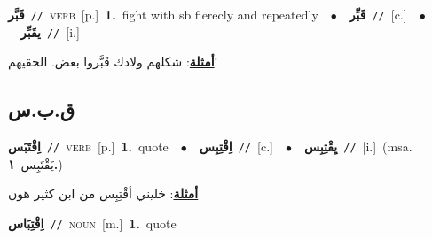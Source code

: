 \documentclass[10pt,a4paper,twoside]{article} %
\begin{document}
\begin{multicols}{2}
{\setlength\topsep{0pt}\textbf{\foreignlanguage{arabic}{قَبَّر}}\ {\color{gray}\texttt{//}\color{black}}\ \textsc{verb}\ [p.]\ \textbf{1.}~fight with sb fierecly and repeatedly\ \ $\bullet$\ \ \setlength\topsep{0pt}\textbf{\foreignlanguage{arabic}{قَبِّر}}\ {\color{gray}\texttt{//}\color{black}}\ [c.]\ \ $\bullet$\ \ \setlength\topsep{0pt}\textbf{\foreignlanguage{arabic}{يقَبِّر}}\ {\color{gray}\texttt{//}\color{black}}\ [i.]\  \begin{flushright}\color{gray}\foreignlanguage{arabic}{\textbf{\underline{\foreignlanguage{arabic}{أمثلة}}}: شكلهم ولادك قَبَّروا بعض. الحقيهم!}\end{flushright}\color{black}} \vspace{2mm}

\vspace{-3mm}
\subsection*{\color{blue}\foreignlanguage{arabic}{ق.ب.س}\color{blue}{}} 

{\setlength\topsep{0pt}\textbf{\foreignlanguage{arabic}{اِقْتَبَس}}\ {\color{gray}\texttt{//}\color{black}}\ \textsc{verb}\ [p.]\ \textbf{1.}~quote\ \ $\bullet$\ \ \setlength\topsep{0pt}\textbf{\foreignlanguage{arabic}{اِقْتِبِس}}\ {\color{gray}\texttt{//}\color{black}}\ [c.]\ \ $\bullet$\ \ \setlength\topsep{0pt}\textbf{\foreignlanguage{arabic}{يِقْتِبِس}}\ {\color{gray}\texttt{//}\color{black}}\ [i.]\ \color{gray}(msa. \foreignlanguage{arabic}{يَقْتَبِس}~\foreignlanguage{arabic}{\textbf{١.}})\color{black}\  \begin{flushright}\color{gray}\foreignlanguage{arabic}{\textbf{\underline{\foreignlanguage{arabic}{أمثلة}}}: خليني أقْتِبِس من ابن كثير هون}\end{flushright}\color{black}} \vspace{2mm}

{\setlength\topsep{0pt}\textbf{\foreignlanguage{arabic}{اِقْتِبَاس}}\ {\color{gray}\texttt{//}\color{black}}\ \textsc{noun}\ [m.]\ \textbf{1.}~quote\ } \vspace{2mm}


\end{multicols}
\end{document}
